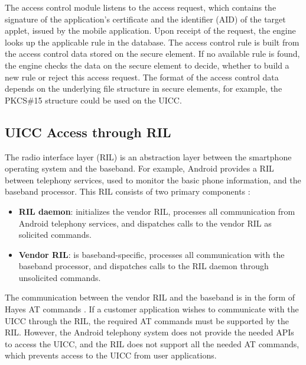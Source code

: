 \documentclass[runningheads,a4paper]{llncs}
\begin{document}
The access control module listens to the access request, which contains the signature of the application's certificate and the identifier (AID) of the target applet, issued by the mobile application.
Upon receipt of the request, the engine looks up the applicable rule in the database.
The access control rule is built from the access control data stored on the secure element. 
If no available rule is found, the engine checks the data on the secure element to decide, whether to build a new rule or reject this access request. 
The format of the access control data depends on the underlying file structure in secure elements, for example, the PKCS\#15 structure could be used on the UICC.

\subsection{UICC Access through RIL}
\label{subsec:uiccaccessthroughril}
The radio interface layer (RIL) is an abstraction layer between the smartphone operating system and the baseband.
For example, Android provides a RIL between telephony services, used to monitor the basic phone information, and the baseband processor. 
This RIL consists of two primary components \cite{Guide}:

\begin{itemize}
	\item \textbf{RIL daemon}: initializes the vendor RIL, processes all communication from Android telephony services, and dispatches calls to the vendor RIL as solicited commands.
	\item \textbf{Vendor RIL}: is baseband-specific, processes all communication with the baseband processor, and dispatches calls to the RIL daemon through unsolicited commands.
\end{itemize}

The communication between the vendor RIL and the baseband is in the form of Hayes AT commands \cite{3GPP2012a}. 
If a customer application wishes to communicate with the UICC through the RIL, the required AT commands must be supported by the RIL. 
However, the Android telephony system does not provide the needed APIs to access the UICC, and the RIL does not support all the needed AT commands, which prevents access to the UICC from user applications.

\end{document}
